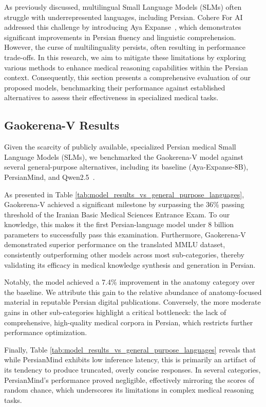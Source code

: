 \documentclass[review]{elsarticle}
\begin{document}
As previously discussed, multilingual Small Language Models (SLMs) often struggle with underrepresented languages, including Persian. Cohere For AI addressed this challenge by introducing Aya Expanse~\cite{b11,b35}, which demonstrates significant improvements in Persian fluency and linguistic comprehension. However, the curse of multilinguality persists, often resulting in performance trade-offs. In this research, we aim to mitigate these limitations by exploring various methods to enhance medical reasoning capabilities within the Persian context. Consequently, this section presents a comprehensive evaluation of our proposed models, benchmarking their performance against established alternatives to assess their effectiveness in specialized medical tasks.

\subsection{Gaokerena-V Results}

Given the scarcity of publicly available, specialized Persian medical Small Language Models (SLMs), we benchmarked the Gaokerena-V model against several general-purpose alternatives, including its baseline (Aya-Expanse-8B), PersianMind, and Qwen2.5~\cite{b37}.

As presented in Table \ref{tab:model_results_vs_general_purpose_languages}, Gaokerena-V achieved a significant milestone by surpassing the 36\% passing threshold of the Iranian Basic Medical Sciences Entrance Exam. To our knowledge, this makes it the first Persian-language model under 8 billion parameters to successfully pass this examination. Furthermore, Gaokerena-V demonstrated superior performance on the translated MMLU dataset, consistently outperforming other models across most sub-categories, thereby validating its efficacy in medical knowledge synthesis and generation in Persian.

Notably, the model achieved a 7.4\% improvement in the anatomy category over the baseline. We attribute this gain to the relative abundance of anatomy-focused material in reputable Persian digital publications. Conversely, the more moderate gains in other sub-categories highlight a critical bottleneck: the lack of comprehensive, high-quality medical corpora in Persian, which restricts further performance optimization.

Finally, Table \ref{tab:model_results_vs_general_purpose_languages} reveals that while PersianMind exhibits low inference latency, this is primarily an artifact of its tendency to produce truncated, overly concise responses. In several categories, PersianMind’s performance proved negligible, effectively mirroring the scores of random chance, which underscores its limitations in complex medical reasoning tasks.
\end{document}
